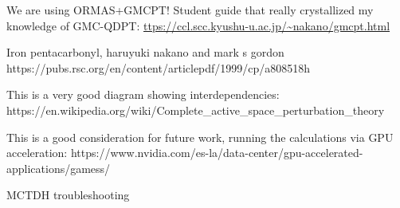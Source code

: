 \documentclass[letterpaper, 12pt, oneside]{report}
\begin{document}
We are using ORMAS+GMCPT! Student guide that really crystallized my knowledge of GMC-QDPT:
\url{ttps://ccl.scc.kyushu-u.ac.jp/~nakano/gmcpt.html}


    

Iron pentacarbonyl, haruyuki nakano and mark s gordon https://pubs.rsc.org/en/content/articlepdf/1999/cp/a808518h


This is a very good diagram showing interdependencies: https://en.wikipedia.org/wiki/Complete\_active\_space\_perturbation\_theory

This is a good consideration for future work, running the calculations via GPU acceleration: 
https://www.nvidia.com/es-la/data-center/gpu-accelerated-applications/gamess/

MCTDH troubleshooting


\else \fi




\end{document}
